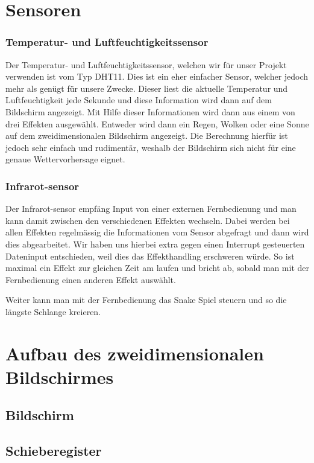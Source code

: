 \documentclass[12pt,a4paper]{article}
\begin{document}
\section{Sensoren}

\subsubsection{Temperatur- und Luftfeuchtigkeitssensor}

Der Temperatur- und Luftfeuchtigkeitssensor, welchen wir für unser Projekt verwenden ist vom Typ DHT11. Dies ist ein eher einfacher Sensor, welcher jedoch mehr als genügt für unsere Zwecke. Dieser liest die aktuelle Temperatur und Luftfeuchtigkeit jede Sekunde und diese Information wird dann auf dem Bildschirm angezeigt. Mit Hilfe dieser Informationen wird dann aus einem von drei Effekten ausgewählt. Entweder wird dann ein Regen, Wolken oder eine Sonne auf dem zweidimensionalen Bildschirm angezeigt. Die Berechnung hierfür ist jedoch sehr einfach und rudimentär, weshalb der Bildschirm sich nicht für eine genaue Wettervorhersage eignet. 

\subsubsection{Infrarot-sensor}

Der Infrarot-sensor empfäng Input von einer externen Fernbedienung und man kann damit zwischen den verschiedenen Effekten wechseln. Dabei werden bei allen Effekten regelmässig die Informationen vom Sensor abgefragt und dann wird dies abgearbeitet. Wir haben uns hierbei extra gegen einen Interrupt gesteuerten Dateninput entschieden, weil dies das Effekthandling erschweren würde. So ist maximal ein Effekt zur gleichen Zeit am laufen und bricht ab, sobald man mit der Fernbedienung einen anderen Effekt auswählt.

Weiter kann man mit der Fernbedienung das Snake Spiel steuern und so die längste Schlange kreieren.

\section{Aufbau des zweidimensionalen Bildschirmes}

\subsection{Bildschirm}

\subsection{Schieberegister}
\end{document}
